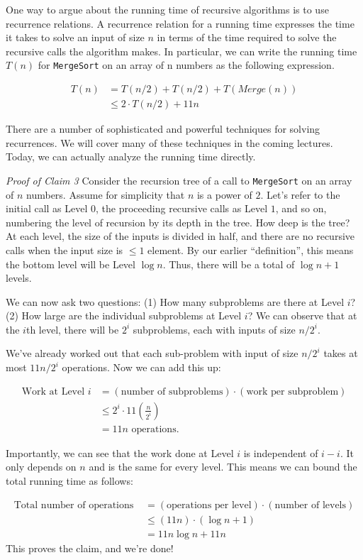 \documentclass [12pt]{article}
\begin{document}
One way to argue about the running time of recursive algorithms is to use recurrence relations. A recurrence relation for a running time expresses the time it takes to solve an input of size $n$ in terms of the time required to solve the recursive calls the algorithm makes. In particular, we can write the running time $T(n)$ for \texttt{MergeSort} on an array of n numbers as the following
expression.

\begin{align*}
T(n) &= T(n/2) + T(n/2) + T(Merge(n)) \\
&\leq 2\cdot T(n/2) + 11n
\end{align*}

There are a number of sophisticated and powerful techniques for solving recurrences. We will cover many of these techniques in the coming lectures. Today, we can actually analyze the running time directly.

\textit{Proof of Claim 3} Consider the recursion tree of a call to \texttt{MergeSort} on an array of $n$ numbers. Assume for simplicity that $n$ is a power of $2$. Let’s refer to the initial call as Level $0$, the proceeding recursive calls as Level $1$, and so on, numbering the level of recursion by its depth in the tree. How deep is the tree? At each level, the size of the inputs is divided in half, and there are no recursive calls when the input size is $\leq 1$ element. By our earlier ``definition'', this means the bottom level will be Level $\log n$. Thus, there will be a total of $\log n + 1$ levels.

We can now ask two questions: (1) How many subproblems are there at Level $i$? (2) How large are the individual subproblems at Level $i$? We can observe that at the $i$th level, there will be $2^i$ subproblems, each with inputs of size $n/2^i$.

We’ve already worked out that each sub-problem with input of size $n/2^
i$ takes at most $11n/2^i$ operations. Now we can add this up:

\begin{align*}
    \text{Work at Level }i &= (\text{number of subproblems}) \cdot (\text{work per subproblem}) \\
    &\leq 2^i \cdot 11 \left( \frac{n}{2^i} \right) \\
    &= 11n \text{ operations.}
\end{align*}

Importantly, we can see that the work done at Level $i$ is independent of $i - i$. It only depends on $n$ and is the same for every level. This means we can bound the total running time as follows:


\begin{align*}
    \text{Total number of operations } &= (\text{operations per level}) \cdot (\text{number of levels}) \\
    &\leq (11n)\cdot (\log n + 1) \\
    &= 11n \log n + 11n
\end{align*}
This proves the claim, and we’re done!
\end{document}
